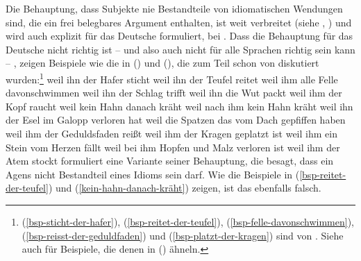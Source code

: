 Die Behauptung, dass Subjekte nie Bestandteile von idiomatischen Wendungen sind, die ein frei belegbares
Argument enthalten, ist weit verbreitet (siehe \zb {},
) und wird auch explizit für das Deutsche formuliert, \zb bei \citet[]{Grewendorf2002a}.
Dass die Behauptung für das Deutsche nicht richtig ist -- und also auch nicht für alle Sprachen richtig sein kann -- ,
zeigen Beispiele wie die in () und (), die zum Teil schon von \citet[]{Reis82} diskutiert
wurden:\footnote{
(\ref{bsp-sticht-der-hafer}), (\ref{bsp-reitet-der-teufel}), (\ref{bsp-felle-davonschwimmen}),
(\ref{bsp-reisst-der-geduldfaden}) und (\ref{bsp-platzt-der-kragen})
 sind von \citet[]{Reis82}. Siehe auch \citet[]{Haider93a} für Beispiele,
die denen in () ähneln.%
}
\eal
\ex\label{bsp-sticht-der-hafer}
weil ihn der Hafer sticht          %
\ex\label{bsp-reitet-der-teufel}
weil ihn der Teufel reitet         %
\ex\label{bsp-felle-davonschwimmen}
weil ihm alle Felle davonschwimmen %
\ex weil ihn der Schlag trifft     %
\ex\label{ex-ihn-die-wut-packt}
weil ihn die Wut packt         %
\ex weil ihm der Kopf raucht       %
\ex\label{kein-hahn-danach-kräht}
weil kein Hahn danach kräht    %
\ex 
weil nach ihm kein Hahn kräht                  %
\ex 
weil ihn der Esel im Galopp verloren hat   %
\ex\label{spatzen-gepfiffen}
weil die Spatzen das vom Dach gepfiffen haben  %
\zl
\eal
\ex\label{bsp-reisst-der-geduldfaden}
weil ihm der Geduldsfaden reißt
\ex\label{bsp-platzt-der-kragen}
weil ihm der Kragen geplatzt ist
\ex weil ihm ein Stein vom Herzen fällt
\ex weil bei ihm Hopfen und Malz verloren ist%
%
\ex weil ihm der Atem stockt
\zl
\citet[--209]{Marantz97a} formuliert eine Variante seiner Behauptung, die besagt, dass ein Agens 
nicht Bestandteil eines Idioms sein
darf. Wie die Beispiele in (\ref{bsp-reitet-der-teufel}) und (\ref{kein-hahn-danach-kräht})
zeigen, ist das ebenfalls falsch.

